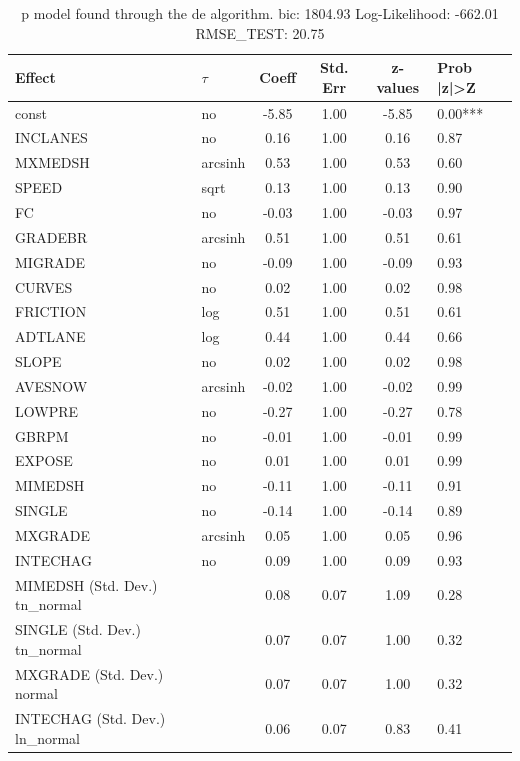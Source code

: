 \begin{table}
	\caption{p model found through the de algorithm. bic: 1804.93 Log-Likelihood: -662.01 RMSE_TEST: 20.75}
	\begin{center}
		\begin{tabular}{|l|l|c|c|c|l|}
			\hline
			Effect & $\tau$ & Coeff & Std. Err & z-values & Prob |z|>Z \\
			\hline
			const & no & -5.85 & 1.00 & -5.85 & 0.00*** \\
			\hline
			INCLANES & no & 0.16 & 1.00 & 0.16 & 0.87 \\
			\hline
			MXMEDSH & arcsinh & 0.53 & 1.00 & 0.53 & 0.60 \\
			\hline
			SPEED & sqrt & 0.13 & 1.00 & 0.13 & 0.90 \\
			\hline
			FC & no & -0.03 & 1.00 & -0.03 & 0.97 \\
			\hline
			GRADEBR & arcsinh & 0.51 & 1.00 & 0.51 & 0.61 \\
			\hline
			MIGRADE & no & -0.09 & 1.00 & -0.09 & 0.93 \\
			\hline
			CURVES & no & 0.02 & 1.00 & 0.02 & 0.98 \\
			\hline
			FRICTION & log & 0.51 & 1.00 & 0.51 & 0.61 \\
			\hline
			ADTLANE & log & 0.44 & 1.00 & 0.44 & 0.66 \\
			\hline
			SLOPE & no & 0.02 & 1.00 & 0.02 & 0.98 \\
			\hline
			AVESNOW & arcsinh & -0.02 & 1.00 & -0.02 & 0.99 \\
			\hline
			LOWPRE & no & -0.27 & 1.00 & -0.27 & 0.78 \\
			\hline
			GBRPM & no & -0.01 & 1.00 & -0.01 & 0.99 \\
			\hline
			EXPOSE & no & 0.01 & 1.00 & 0.01 & 0.99 \\
			\hline
			MIMEDSH & no & -0.11 & 1.00 & -0.11 & 0.91 \\
			\hline
			SINGLE & no & -0.14 & 1.00 & -0.14 & 0.89 \\
			\hline
			MXGRADE & arcsinh & 0.05 & 1.00 & 0.05 & 0.96 \\
			\hline
			INTECHAG & no & 0.09 & 1.00 & 0.09 & 0.93 \\
			\hline
			MIMEDSH (Std. Dev.) tn_normal &  & 0.08 & 0.07 & 1.09 & 0.28 \\
			\hline
			SINGLE (Std. Dev.) tn_normal &  & 0.07 & 0.07 & 1.00 & 0.32 \\
			\hline
			MXGRADE (Std. Dev.) normal &  & 0.07 & 0.07 & 1.00 & 0.32 \\
			\hline
			INTECHAG (Std. Dev.) ln_normal &  & 0.06 & 0.07 & 0.83 & 0.41 \\
			\hline
		\end{tabular}
	\end{center}
\end{table}
